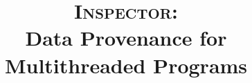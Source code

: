 \documentclass{IEEEtran}
\newcommand{\projecttitle}{\textsc{Inspector}\xspace}
\begin{document}

\author{
}
\title{\projecttitle:\\ Data Provenance for Multithreaded Programs}
\maketitle




%









 
\end{document}
